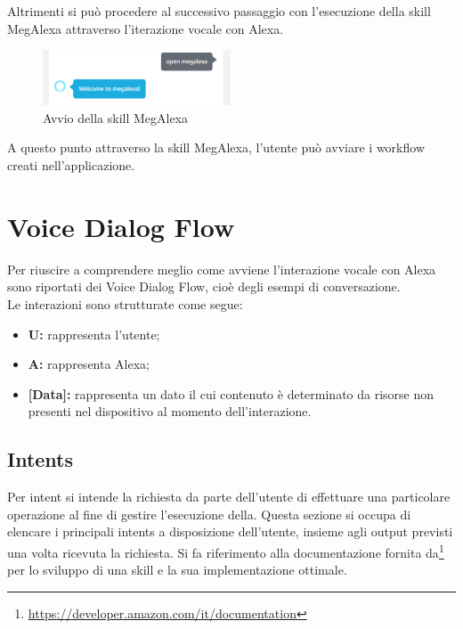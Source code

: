 \begin{itemize}
Altrimenti si può procedere al successivo passaggio con l'esecuzione della skill MegAlexa attraverso l'iterazione vocale con Alexa. \\

\begin{figure}[!ht]
	\centering
	\includegraphics[width=0.5\textwidth]{images/OpenMegAlexa.png}
	\caption{Avvio della skill MegAlexa}
\end{figure}

\end{itemize}

A questo punto attraverso la skill MegAlexa, l'utente può avviare i workflow creati nell'applicazione.\\

\newpage
\section{Voice Dialog Flow}
\label{VDF}
Per riuscire a comprendere meglio come avviene l'interazione vocale con Alexa sono riportati dei Voice Dialog Flow, cioè degli esempi di conversazione.\\

Le interazioni sono strutturate come segue:
\begin{itemize}
	\item \textbf{U:} rappresenta l'utente;
	\item \textbf{A:} rappresenta Alexa;
	\item \textbf{[Data]:} rappresenta un dato il cui contenuto è determinato da risorse non presenti nel dispositivo al momento dell'interazione.
\end{itemize}

\subsection{Intents}
Per intent si intende la richiesta da parte dell'utente di effettuare una particolare operazione al fine di gestire l'esecuzione della. 
Questa sezione si occupa di elencare i principali intents a disposizione dell'utente, insieme agli output previsti una volta ricevuta la richiesta.
Si fa riferimento alla documentazione fornita da\footnote{\url{https://developer.amazon.com/it/documentation}} per lo sviluppo di una skill e la sua implementazione ottimale.

